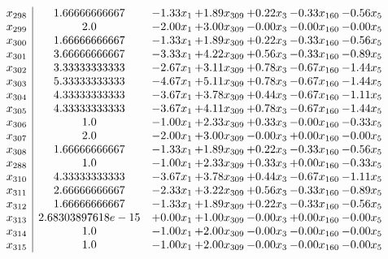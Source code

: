 \documentclass[8pt]{article}
\begin{document}
\[\begin{array}{c| c c@{\hskip 2pt} c@{\hskip 2pt} c@{\hskip 2pt} c@{\hskip 2pt} c@{\hskip 2pt} }
 x_{298}   &  1.66666666667 & -1.33 x_{1} & +  1.89 x_{309} & +  0.22 x_{3} & -0.33 x_{160} & -0.56 x_{5}\\
 x_{299}   &  2.0 & -2.00 x_{1} & +  3.00 x_{309} & -0.00 x_{3} & -0.00 x_{160} & -0.00 x_{5}\\
 x_{300}   &  1.66666666667 & -1.33 x_{1} & +  1.89 x_{309} & +  0.22 x_{3} & -0.33 x_{160} & -0.56 x_{5}\\
 x_{301}   &  3.66666666667 & -3.33 x_{1} & +  4.22 x_{309} & +  0.56 x_{3} & -0.33 x_{160} & -0.89 x_{5}\\
 x_{302}   &  3.33333333333 & -2.67 x_{1} & +  3.11 x_{309} & +  0.78 x_{3} & -0.67 x_{160} & -1.44 x_{5}\\
 x_{303}   &  5.33333333333 & -4.67 x_{1} & +  5.11 x_{309} & +  0.78 x_{3} & -0.67 x_{160} & -1.44 x_{5}\\
 x_{304}   &  4.33333333333 & -3.67 x_{1} & +  3.78 x_{309} & +  0.44 x_{3} & -0.67 x_{160} & -1.11 x_{5}\\
 x_{305}   &  4.33333333333 & -3.67 x_{1} & +  4.11 x_{309} & +  0.78 x_{3} & -0.67 x_{160} & -1.44 x_{5}\\
 x_{306}   &  1.0 & -1.00 x_{1} & +  2.33 x_{309} & +  0.33 x_{3} & -0.00 x_{160} & -0.33 x_{5}\\
 x_{307}   &  2.0 & -2.00 x_{1} & +  3.00 x_{309} & -0.00 x_{3} & +  0.00 x_{160} & -0.00 x_{5}\\
 x_{308}   &  1.66666666667 & -1.33 x_{1} & +  1.89 x_{309} & +  0.22 x_{3} & -0.33 x_{160} & -0.56 x_{5}\\
 x_{288}   &  1.0 & -1.00 x_{1} & +  2.33 x_{309} & +  0.33 x_{3} & +  0.00 x_{160} & -0.33 x_{5}\\
 x_{310}   &  4.33333333333 & -3.67 x_{1} & +  3.78 x_{309} & +  0.44 x_{3} & -0.67 x_{160} & -1.11 x_{5}\\
 x_{311}   &  2.66666666667 & -2.33 x_{1} & +  3.22 x_{309} & +  0.56 x_{3} & -0.33 x_{160} & -0.89 x_{5}\\
 x_{312}   &  1.66666666667 & -1.33 x_{1} & +  1.89 x_{309} & +  0.22 x_{3} & -0.33 x_{160} & -0.56 x_{5}\\
 x_{313}   &  2.68303897618e-15 & +  0.00 x_{1} & +  1.00 x_{309} & -0.00 x_{3} & +  0.00 x_{160} & -0.00 x_{5}\\
 x_{314}   &  1.0 & -1.00 x_{1} & +  2.00 x_{309} & -0.00 x_{3} & -0.00 x_{160} & -0.00 x_{5}\\
 x_{315}   &  1.0 & -1.00 x_{1} & +  2.00 x_{309} & -0.00 x_{3} & -0.00 x_{160} & -0.00 x_{5}\\

\end{array}\]
\end{document}
